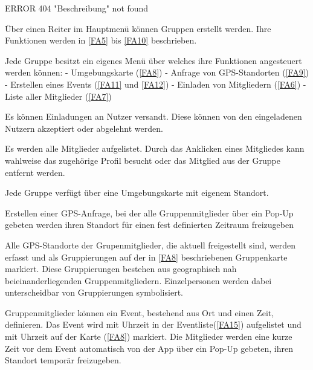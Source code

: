 \documentclass[parskip=full,11pt,twoside]{scrartcl}
\begin{document}
\label{FA3}
ERROR 404 "Beschreibung" not found

\label{FA4}
Über einen Reiter im Hauptmenü können Gruppen erstellt werden. Ihre Funktionen werden in \ref{FA5} bis \ref{FA10} beschrieben.

\label{FA5}
Jede Gruppe besitzt ein eigenes Menü über welches ihre Funktionen angesteuert werden können:
- Umgebungskarte (\ref{FA8})
- Anfrage von GPS-Standorten (\ref{FA9})
- Erstellen eines Events (\ref{FA11} und \ref{FA12})
- Einladen von Mitgliedern (\ref{FA6})
- Liste aller Mitglieder (\ref{FA7})

\label{FA6}
Es können Einladungen an Nutzer versandt. Diese können von den eingeladenen Nutzern akzeptiert oder abgelehnt werden.

\label{FA7}
Es werden alle Mitglieder aufgelistet. Durch das Anklicken eines Mitgliedes kann wahlweise das zugehörige Profil besucht oder das Mitglied aus der Gruppe entfernt werden.

\label{FA8}
Jede Gruppe verfügt über eine Umgebungskarte mit eigenem Standort.

\label{FA9}
Erstellen einer GPS-Anfrage, bei der alle Gruppenmitglieder über ein Pop-Up gebeten werden ihren Standort für einen fest definierten Zeitraum freizugeben

\label{FA10}
Alle GPS-Standorte der Grupenmitglieder, die aktuell freigestellt sind, werden erfasst und als Gruppierungen auf der in \ref{FA8} beschriebenen Gruppenkarte markiert. Diese Gruppierungen bestehen aus geographisch nah beieinanderliegenden Gruppenmitgliedern. Einzelpersonen werden dabei unterscheidbar von Gruppierungen symbolisiert.

\label{FA11}
Gruppenmitglieder können ein Event, bestehend aus Ort und einen Zeit, definieren. Das Event wird mit Uhrzeit in der Eventliste(\ref{FA15}) aufgelistet und mit Uhrzeit auf der Karte (\ref{FA8}) markiert. Die Mitglieder werden eine kurze Zeit vor dem Event automatisch von der App über ein Pop-Up gebeten, ihren Standort temporär freizugeben.
\end{document}
